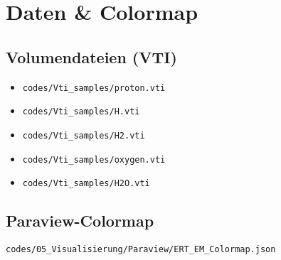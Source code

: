 \chapter{Daten \& Colormap}
\section{Volumendateien (VTI)}
\begin{itemize}
  \item \texttt{codes/Vti\_samples/proton.vti}
  \item \texttt{codes/Vti\_samples/H.vti}
  \item \texttt{codes/Vti\_samples/H2.vti}
  \item \texttt{codes/Vti\_samples/oxygen.vti}
  \item \texttt{codes/Vti\_samples/H2O.vti}
\end{itemize}

\section{Paraview-Colormap}
\texttt{codes/05\_Visualisierung/Paraview/ERT\_EM\_Colormap.json}
